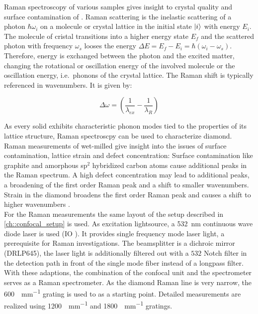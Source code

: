 			Raman spectroscopy of various samples gives insight to crystal quality and surface contamination of \nds.
			Raman scattering is the inelastic scattering of a photon $\hbar\omega_i$ on a molecule or crystal lattice in the initial state $\ket{i}$ with energy $E_i$.
			The molecule of cristal transitions into a higher energy state $E_f$ and the scattered photon with frequency $\omega_s$ looses the energy $\Delta E = E_f - E_i = \hbar(\omega_i-\omega_s)$.
			Therefore, energy is exchanged between the photon and the excited matter, changing the rotational or oscillation energy of the involved molecule or the oscillation energy, i.e.\ phonons of the crystal lattice.
			The Raman shift is typically referenced in wavenumbers.
			It is given by:

			\begin{equation}
				\Delta \omega = \left( \frac{1}{\lambda_{ex}}-\frac{1}{\lambda_R}\right)
			\end{equation}

			As every solid exhibits characteristic phonon modes tied to the properties of its lattice structure, Raman spectroscpy can be used to characterize diamond.
			Raman measurements of wet-milled \nds give insight into the issues of surface contamination, lattice strain and defect concentration:
			Surface contamination like graphite and amorphous sp$^2$ hybridized carbon atoms cause additional peaks in the Raman spectrum.
			A high defect concentration may lead to additional peaks, a broadening of the first order Raman peak and a shift to smaller wavenumbers.
			Strain in the diamond broadens the first order Raman peak and causes a shift to higher wavenumbers \cite{Zaitsev2001,Prawer2004,Orwa2000}.
			\\
			For the Raman measurements the same layout of the setup described in \autoref{ch::confocal_setup} is used.
			As excitation lightsource, a \SI{532}{nm} continuous wave diode laser is used (IO ).
			It provides single frequency mode laser light, a prerequisite for Raman investigations.
			The beamsplitter is a dichroic mirror (DRLP645), the laser light is additionally filtered out with a $532$ Notch filter in the detection path in front of the single mode fiber instead of a longpass filter.
			With these adaptions, the combination of the confocal unit and the spectrometer serves as a Raman spectrometer.
			As the diamond Raman line is very narrow, the \SI[per-mode=symbol]{600}{\lines\per\mm} grating is used to as a starting point. Detailed measurements are realized using \SI[per-mode=symbol]{1200}{\lines\per\mm} and \SI[per-mode=symbol]{1800}{\lines\per\mm} gratings.
			\\

